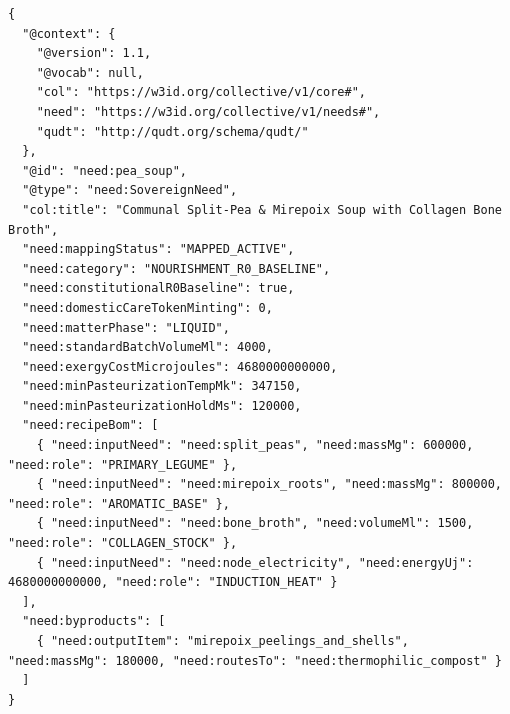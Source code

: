 \begin{lstlisting}[language=jsonld,caption={Canonical v3.1 JSON-LD fragment harmonizing \texttt{SovereignNeed} stoichiometry with pure 64-bit fixed-point \texttt{uJ}, \texttt{mg}, \texttt{mL}, and \texttt{mK} units.}]
{
  "@context": {
    "@version": 1.1,
    "@vocab": null,
    "col": "https://w3id.org/collective/v1/core#",
    "need": "https://w3id.org/collective/v1/needs#",
    "qudt": "http://qudt.org/schema/qudt/"
  },
  "@id": "need:pea_soup",
  "@type": "need:SovereignNeed",
  "col:title": "Communal Split-Pea & Mirepoix Soup with Collagen Bone Broth",
  "need:mappingStatus": "MAPPED_ACTIVE",
  "need:category": "NOURISHMENT_R0_BASELINE",
  "need:constitutionalR0Baseline": true,
  "need:domesticCareTokenMinting": 0,
  "need:matterPhase": "LIQUID",
  "need:standardBatchVolumeMl": 4000,
  "need:exergyCostMicrojoules": 4680000000000,
  "need:minPasteurizationTempMk": 347150,
  "need:minPasteurizationHoldMs": 120000,
  "need:recipeBom": [
    { "need:inputNeed": "need:split_peas", "need:massMg": 600000, "need:role": "PRIMARY_LEGUME" },
    { "need:inputNeed": "need:mirepoix_roots", "need:massMg": 800000, "need:role": "AROMATIC_BASE" },
    { "need:inputNeed": "need:bone_broth", "need:volumeMl": 1500, "need:role": "COLLAGEN_STOCK" },
    { "need:inputNeed": "need:node_electricity", "need:energyUj": 4680000000000, "need:role": "INDUCTION_HEAT" }
  ],
  "need:byproducts": [
    { "need:outputItem": "mirepoix_peelings_and_shells", "need:massMg": 180000, "need:routesTo": "need:thermophilic_compost" }
  ]
}
\end{lstlisting}

